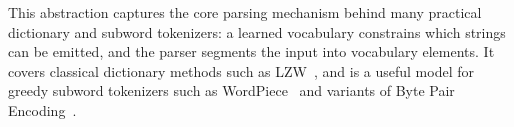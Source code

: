\documentclass{article}
\theoremstyle{plain}
\theoremstyle{definition}
\newtheorem{definition}{Definition}[section]
\theoremstyle{remark}
\begin{document}
    This abstraction captures the core parsing mechanism behind many practical
    dictionary and subword tokenizers: a learned vocabulary constrains which strings
    can be emitted, and the parser segments the input into vocabulary elements. It
    covers classical dictionary methods such as LZW~\citep{zouharTokenizationNoiselessChannel2023}, and is a useful
    model for greedy subword tokenizers such as WordPiece~\citep{devlinBERTPretrainingDeep2019}
    and variants of Byte Pair Encoding~\citep{sennrichNeuralMachineTranslation2016}.
    
    
    
    
\end{document}

